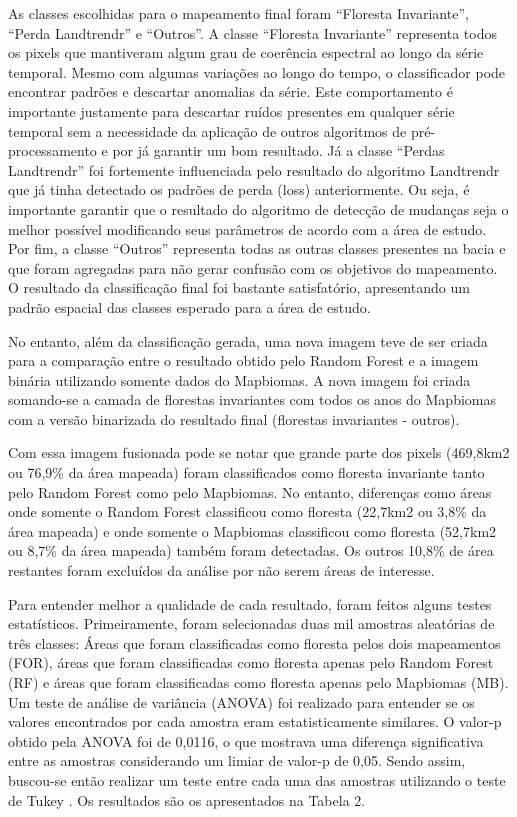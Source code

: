 As classes escolhidas para o mapeamento final foram “Floresta Invariante”, “Perda Landtrendr” e “Outros”. A classe “Floresta Invariante” representa todos os pixels que mantiveram algum grau de coerência espectral ao longo da série temporal. Mesmo com algumas variações ao longo do tempo, o classificador pode encontrar padrões e descartar anomalias da série. Este comportamento é importante justamente para descartar ruídos presentes em qualquer série temporal sem a necessidade da aplicação de outros algoritmos de pré-processamento e por já garantir um bom resultado. Já a classe “Perdas Landtrendr” foi fortemente influenciada pelo resultado do algoritmo Landtrendr que já tinha detectado os padrões de perda (loss) anteriormente. Ou seja, é importante garantir que o resultado do algoritmo de detecção de mudanças seja o melhor possível modificando seus parâmetros de acordo com a área de estudo. Por fim, a classe “Outros” representa todas as outras classes presentes na bacia e que foram agregadas para não gerar confusão com os objetivos do mapeamento. O resultado da classificação final foi bastante satisfatório, apresentando um padrão espacial das classes esperado para a área de estudo.

No entanto, além da classificação gerada, uma nova imagem teve de ser criada para a comparação entre o resultado obtido pelo Random Forest e a imagem binária utilizando somente dados do Mapbiomas. A nova imagem foi criada somando-se a camada de florestas invariantes com todos os anos do Mapbiomas com a versão binarizada do resultado final (florestas invariantes - outros).

Com essa imagem fusionada pode se notar que grande parte dos pixels (469,8km2 ou 76,9\% da área mapeada) foram classificados como floresta invariante tanto pelo Random Forest como pelo Mapbiomas. No entanto, diferenças como áreas onde somente o Random Forest classificou como floresta (22,7km2 ou 3,8\% da área mapeada) e onde somente o Mapbiomas classificou como floresta (52,7km2 ou 8,7\% da área mapeada) também foram detectadas. Os outros 10,8\% de área restantes foram excluídos da análise por não serem áreas de interesse.

Para entender melhor a qualidade de cada resultado, foram feitos alguns testes estatísticos. Primeiramente, foram selecionadas duas mil amostras aleatórias de três classes: Áreas que foram classificadas como floresta pelos dois mapeamentos (FOR), áreas que foram classificadas como floresta apenas pelo Random Forest (RF) e áreas que foram classificadas como floresta apenas pelo Mapbiomas (MB). Um teste de análise de variância (ANOVA) foi realizado para entender se os valores encontrados por cada amostra eram estatisticamente similares. O valor-p obtido pela ANOVA foi de 0,0116, o que mostrava uma diferença significativa entre as amostras considerando um limiar de valor-p de 0,05. Sendo assim, buscou-se então realizar um teste entre cada uma das amostras utilizando o teste de Tukey \citep{Tukey1949}. Os resultados são os apresentados na Tabela 2.

